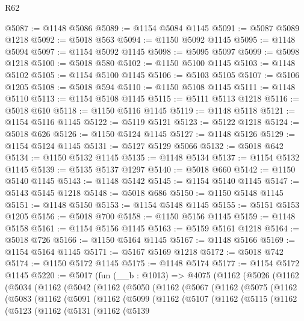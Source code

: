 \begin{lexlean}{R62}
\begin{coremodule}
@5087 := @1148 @5086
@5089 := @1154 @5084 @1145
@5091 := @5087 @5089 @1218
@5092 := @5018 @563
@5094 := @1150 @5092 @1145
@5095 := @1148 @5094
@5097 := @1154 @5092 @1145
@5098 := @5095 @5097
@5099 := @5098 @1218
@5100 := @5018 @580
@5102 := @1150 @5100 @1145
@5103 := @1148 @5102
@5105 := @1154 @5100 @1145
@5106 := @5103 @5105
@5107 := @5106 @1205
@5108 := @5018 @594
@5110 := @1150 @5108 @1145
@5111 := @1148 @5110
@5113 := @1154 @5108 @1145
@5115 := @5111 @5113 @1218
@5116 := @5018 @610
@5118 := @1150 @5116 @1145
@5119 := @1148 @5118
@5121 := @1154 @5116 @1145
@5122 := @5119 @5121
@5123 := @5122 @1218
@5124 := @5018 @626
@5126 := @1150 @5124 @1145
@5127 := @1148 @5126
@5129 := @1154 @5124 @1145
@5131 := @5127 @5129 @5066
@5132 := @5018 @642
@5134 := @1150 @5132 @1145
@5135 := @1148 @5134
@5137 := @1154 @5132 @1145
@5139 := @5135 @5137 @1297
@5140 := @5018 @660
@5142 := @1150 @5140 @1145
@5143 := @1148 @5142
@5145 := @1154 @5140 @1145
@5147 := @5143 @5145 @1218
@5148 := @5018 @686
@5150 := @1150 @5148 @1145
@5151 := @1148 @5150
@5153 := @1154 @5148 @1145
@5155 := @5151 @5153 @1205
@5156 := @5018 @700
@5158 := @1150 @5156 @1145
@5159 := @1148 @5158
@5161 := @1154 @5156 @1145
@5163 := @5159 @5161 @1218
@5164 := @5018 @726
@5166 := @1150 @5164 @1145
@5167 := @1148 @5166
@5169 := @1154 @5164 @1145
@5171 := @5167 @5169 @1218
@5172 := @5018 @742
@5174 := @1150 @5172 @1145
@5175 := @1148 @5174
@5177 := @1154 @5172 @1145
@5220 := @5017
    (fun (__b : @1013) =>
    @4075
      (@1162
        (@5026
          (@1162
            (@5034
              (@1162
                (@5042
                  (@1162
                    (@5050
                      (@1162
                        (@5067
                          (@1162
                            (@5075
                              (@1162
                                (@5083
                                  (@1162
                                    (@5091
                                      (@1162
                                        (@5099
                                          (@1162
                                            (@5107
                                              (@1162
                                                (@5115
                                                  (@1162
                                                    (@5123
                                                      (@1162
                                                        (@5131
                                                          (@1162
                                                            (@5139

\end{coremodule}
\end{lexlean}
